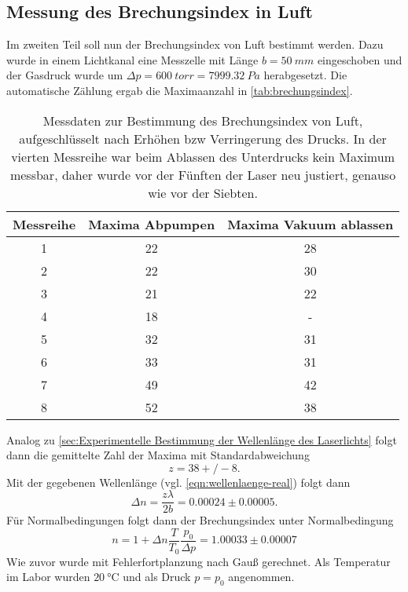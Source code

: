\subsection{Messung des Brechungsindex in Luft}
\label{sec:Messung des Brechungsindex in Luft}
Im zweiten Teil soll nun der Brechungsindex von Luft bestimmt werden. Dazu wurde in
einem Lichtkanal eine Messzelle mit Länge $b = \SI{50}{mm}$ eingeschoben und der Gasdruck
wurde um $\Delta p = \SI{600}{torr} = \SI{7999,32}{Pa}$ herabgesetzt. Die automatische
Zählung ergab die Maximaanzahl in \autoref{tab:brechungsindex}.
\begin{table}
  \centering
  \caption{Messdaten zur Bestimmung des Brechungsindex von Luft, aufgeschlüsselt nach
  Erhöhen bzw Verringerung des Drucks. In der vierten Messreihe war beim Ablassen des
  Unterdrucks kein Maximum messbar, daher wurde vor der Fünften der Laser neu justiert,
  genauso wie vor der Siebten.}
  \label{tab:brechungsindex}
  \begin{tabular}{c c c}
  \toprule
  Messreihe & Maxima Abpumpen & Maxima Vakuum ablassen\\
  \midrule
  1 & 22 & 28 \\
  2 & 22 & 30 \\
  3 & 21 & 22 \\
  4 & 18 & -  \\
  5 & 32 & 31 \\
  6 & 33 & 31 \\
  7 & 49 & 42 \\
  8 & 52 & 38 \\
  \bottomrule
  \end{tabular}
\end{table}
Analog zu \autoref{sec:Experimentelle Bestimmung der Wellenlänge des Laserlichts} folgt
dann die gemittelte Zahl der Maxima mit Standardabweichung
\[
	z = 38+/-8.
\]
Mit der gegebenen Wellenlänge (vgl. \autoref{eqn:wellenlaenge-real}) folgt dann
\begin{equation}
	\Delta n = \frac{z \lambda}{2b} = 0.00024 \pm 0.00005.
\end{equation}
Für Normalbedingungen folgt dann der Brechungsindex unter Normalbedingung
\begin{equation}
	n = 1 + \Delta n \frac{T}{T_0} \frac{p_0}{\Delta p} = 1.00033 \pm 0.00007
\end{equation}
Wie zuvor wurde mit Fehlerfortplanzung nach Gauß gerechnet. Als Temperatur im Labor 
wurden $\SI{20}{\celsius}$ und als Druck $p = p_0$ angenommen.
